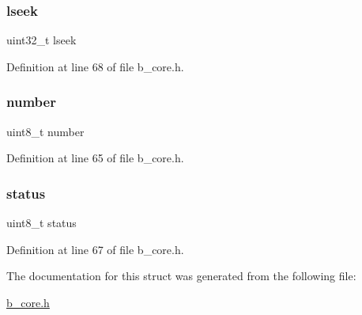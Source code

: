 \subsubsection{\texorpdfstring{lseek}{lseek}}
{\footnotesize\ttfamily uint32\+\_\+t lseek}



Definition at line 68 of file b\+\_\+core.\+h.

\mbox{\label{structb_core_fd__t_af57eaec6f3dec6de717735725c9908a6}} 
\subsubsection{\texorpdfstring{number}{number}}
{\footnotesize\ttfamily uint8\+\_\+t number}



Definition at line 65 of file b\+\_\+core.\+h.

\mbox{\label{structb_core_fd__t_ade818037fd6c985038ff29656089758d}} 
\subsubsection{\texorpdfstring{status}{status}}
{\footnotesize\ttfamily uint8\+\_\+t status}



Definition at line 67 of file b\+\_\+core.\+h.



The documentation for this struct was generated from the following file\+:\begin{DoxyCompactItemize}
\item 
\mbox{\hyperlink{b__core_8h}{b\+\_\+core.\+h}}\end{DoxyCompactItemize}
